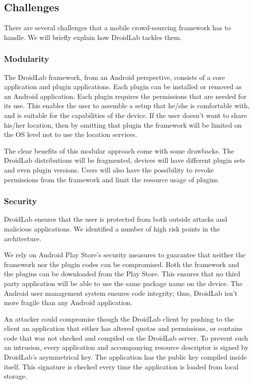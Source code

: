 \documentclass[conference,letterpaper]{IEEEtran}
\begin{document}
\subsection{Challenges}

There are several challenges that a mobile crowd-sourcing framework has to handle. We will briefly explain how DroidLab tackles them.
 
\subsubsection{Modularity}
The DroidLab framework, from an Android perspective, consists of a core application and plugin applications. Each plugin can be installed or removed as an Android application. Each plugin requires the permissions that are needed for its use. This enables the user to assemble a setup that he/she is comfortable with, and is suitable for the capabilities of the device. If the user doesn't want to share his/her location, then by omitting that plugin the framework will be limited on the OS level not to use the location services.

The clear benefits of this modular approach come with some drawbacks. The DroidLab distributions will be fragmented, devices will have different plugin sets and even plugin versions. Users will also have the possibility to revoke permissions from the framework and limit the resource usage of plugins.

\subsubsection{Security}
DroidLab ensures that the user is protected from both outside attacks and malicious applications. We identified a number of high risk points in the architecture.

We rely on Android Play Store's security measures to guarantee that neither the framework nor the plugin codes can be compromised. Both the framework and the plugins can be downloaded from the Play Store. This ensures that no third party application will be able to use the same package name on the device. The Android user management system ensures code integrity; thus, DroidLab isn't more fragile than any Android application.

An attacker could compromise though the DroidLab client by pushing to the client an application that either has altered quotas and permissions, or contains code that was not checked and compiled on the DroidLab server. To prevent such an intrusion, every application and accompanying resource descriptor is signed by DroidLab's asymmetrical key. The application has the public key compiled inside itself. This signature is checked every time the application is loaded from local storage.
\end{document}
